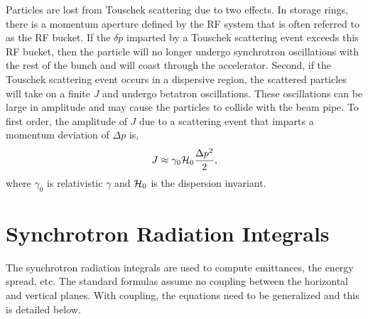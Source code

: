 Particles are lost from Touschek scattering due to two effects.  In
storage rings, there is a momentum aperture defined by the RF system
that is often referred to as the RF bucket.  If the $\delta p$
imparted by a Touschek scattering event exceeds this RF bucket, then
the particle will no longer undergo synchrotron oscillations with the
rest of the bunch and will coast through the accelerator.  Second, if
the Touschek scattering event occurs in a dispersive region, the
scattered particles will take on a finite $J$ and undergo betatron
oscillations.  These oscillations can be large in amplitude and may
cause the particles to collide with the beam pipe.  To first order,
the amplitude of $J$ due to a scattering event that imparts a momentum
deviation of $\Delta p$ is,
\begin{equation}
  J\approx\gamma_0{\cal H}_0\frac{\Delta p^2}{2},
\end{equation}
where $\gamma_0$ is relativistic $\gamma$ and ${\cal H}_0$ is the dispersion invariant.

\section{Synchrotron Radiation Integrals}
\label{s:synch.ints}

The synchrotron radiation integrals are used to compute emittances,
the energy spread, etc. The standard formulas assume no coupling
between the horizontal and vertical planes\cite{b:helm,b:jowett}. With
coupling, the equations need to be generalized and this is detailed
below.

